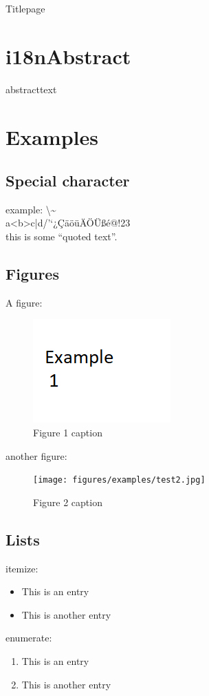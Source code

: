 \documentclass{report}
\begin{document}
\thispagestyle{empty}
Titlepage

\newpage

\tableofcontents
\newpage

\chapter{i18nAbstract}
abstracttext

\chapter{Examples}
\section{Special character}
example: \textbackslash \textasciitilde \\
a<b>c|d/'`¿ÇäöüÄÖÜßé@!23\\
this is some \enquote{quoted text}.

\section{Figures}
A figure:
\begin{figure}[H]
    \centering
    \includegraphics{figures/examples/test1.png}
    \caption{Figure 1 caption}\label{fig:fig1}
\end{figure}
another figure:
\begin{figure}[H]
    \centering
    \texttt{[image: figures/examples/test2.jpg]}
    \caption{Figure 2 caption}\label{fig:fig2}
\end{figure}

\section{Lists}
itemize:
\begin{itemize}
    \item This is an entry
    \item This is another entry
\end{itemize}
enumerate:
\begin{enumerate}
    \item This is an entry
    \item This is another entry
\end{enumerate}
\end{document}
